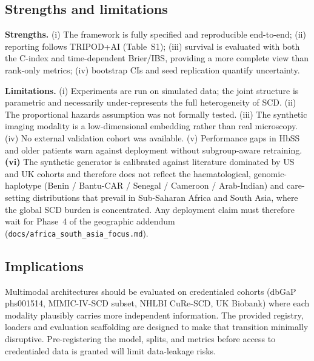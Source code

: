 \documentclass[11pt,a4paper]{article}
\begin{document}
\subsection{Strengths and limitations}
\textbf{Strengths.} (i) The framework is fully specified and reproducible end-to-end; (ii) reporting follows TRIPOD+AI (Table~S1); (iii) survival is evaluated with both the C-index and time-dependent Brier/IBS, providing a more complete view than rank-only metrics; (iv) bootstrap CIs and seed replication quantify uncertainty.

\textbf{Limitations.} (i) Experiments are run on simulated data; the joint structure is parametric and necessarily under-represents the full heterogeneity of SCD. (ii) The proportional hazards assumption was not formally tested. (iii) The synthetic imaging modality is a low-dimensional embedding rather than real microscopy. (iv) No external validation cohort was available. (v) Performance gaps in HbSS and older patients warn against deployment without subgroup-aware retraining. \textbf{(vi)} The synthetic generator is calibrated against literature dominated by US and UK cohorts and therefore does not reflect the haematological, genomic-haplotype (Benin / Bantu-CAR / Senegal / Cameroon / Arab-Indian) and care-setting distributions that prevail in Sub-Saharan Africa and South Asia, where the global SCD burden is concentrated. Any deployment claim must therefore wait for Phase~4 of the geographic addendum (\texttt{docs/africa\_south\_asia\_focus.md}).
\subsection{Implications}
Multimodal architectures should be evaluated on credentialed cohorts (dbGaP phs001514, MIMIC-IV-SCD subset, NHLBI CuRe-SCD, UK Biobank) where each modality plausibly carries more independent information. The provided registry, loaders and evaluation scaffolding are designed to make that transition minimally disruptive. Pre-registering the model, splits, and metrics before access to credentialed data is granted will limit data-leakage risks.
\end{document}
